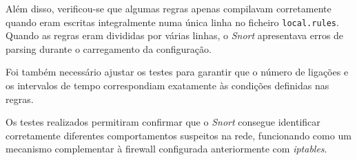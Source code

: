 \documentclass{article}
\begin{document}
Além disso, verificou-se que algumas regras apenas compilavam corretamente quando eram escritas integralmente numa única linha no ficheiro \texttt{local.rules}. Quando as regras eram divididas por várias linhas, o \textit{Snort} apresentava erros de parsing durante o carregamento da configuração.

Foi também necessário ajustar os testes para garantir que o número de ligações e os intervalos de tempo correspondiam exatamente às condições definidas nas regras.

Os testes realizados permitiram confirmar que o \textit{Snort} consegue identificar corretamente diferentes comportamentos suspeitos na rede, funcionando como um mecanismo complementar à firewall configurada anteriormente com \textit{iptables}.
\end{document}
